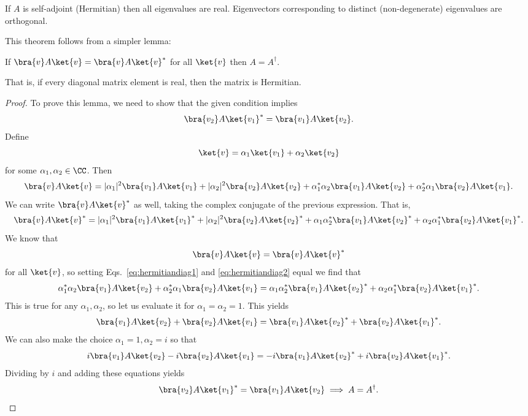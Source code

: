 \begin{thm}
    If $A$ is self-adjoint (Hermitian) then all eigenvalues are real. Eigenvectors corresponding to distinct (non-degenerate) eigenvalues are orthogonal.
\end{thm}
This theorem follows from a simpler lemma:
\begin{lem}
    If $\bra{v} A \ket{v}=\bra{v} A \ket{v}^*$ for all $\ket{v}$ then $A=A^\dagger.$
\end{lem}
That is, if every diagonal matrix element is real, then the matrix is Hermitian.
\begin{proof}
To prove this lemma, we need to show that the given condition implies
\begin{equation}
    \bra{v_2}A \ket{v_1}^*= \bra{v_1} A \ket{v_2}.
\end{equation}
Define 
\begin{equation}
    \ket{v}=\alpha_1 \ket{v_1} +\alpha_2 \ket{v_2}
\end{equation}
for some $\alpha_1,\alpha_2\in \CC$. Then
\begin{equation}\label{eq:hermitiandiag1}
    \bra{v} A \ket{v} = |\alpha_1|^2 \bra{v_1} A \ket{v_1} + |\alpha_2|^2 \bra{v_2} A \ket{v_2} + \alpha_1 ^* \alpha_2 \bra{v_1} A \ket{v_2}  +\alpha_2^* \alpha_1 \bra{v_2} A \ket{v_1}.
\end{equation}
We can write $\bra{v}A \ket{v}^*$ as well, taking the complex conjugate of the previous expression. That is,
\begin{equation}\label{eq:hermitiandiag2}
    \bra{v} A \ket{v}^* = |\alpha_1|^2 \bra{v_1} A \ket{v_1}^* + |\alpha_2|^2 \bra{v_2} A \ket{v_2}^* + \alpha_1 \alpha_2^* \bra{v_1} A \ket{v_2}^*  +\alpha_2 \alpha_1^* \bra{v_2} A \ket{v_1}^*.
\end{equation}
We know that
\begin{equation}
    \bra{v} A \ket{v}=\bra{v} A \ket{v}^*
\end{equation}
for all $\ket{v}$, so setting Eqs.~\eqref{eq:hermitiandiag1} and \eqref{eq:hermitiandiag2} equal we find that
\begin{equation}
    \alpha_1 ^* \alpha_2 \bra{v_1} A \ket{v_2}  +\alpha_2^* \alpha_1 \bra{v_2} A \ket{v_1} = \alpha_1 \alpha_2^* \bra{v_1} A \ket{v_2}^*  +\alpha_2 \alpha_1^* \bra{v_2} A \ket{v_1}^*.
\end{equation}
This is true for any $\alpha_1,\alpha_2$, so let us evaluate it for $\alpha_1=\alpha_2=1.$ This yields
\begin{equation}
    \bra{v_1}A \ket{v_2} + \bra{v_2} A\ket{v_1} = \bra{v_1} A \ket{v_2}^* + \bra{v_2} A \ket{v_1}^*.
\end{equation}
We can also make the choice $\alpha_1=1,\alpha_2=i$ so that
\begin{equation}
    i\bra{v_1}A \ket{v_2} -i\bra{v_2} A\ket{v_1} = -i\bra{v_1} A \ket{v_2}^* + i\bra{v_2} A \ket{v_1}^*.
\end{equation}
Dividing by $i$ and adding these equations yields
\begin{equation}
    \bra{v_2} A \ket{v_1}^* = \bra{v_1} A \ket{v_2} \implies A = A^\dagger.\qedhere
\end{equation}
\end{proof}

